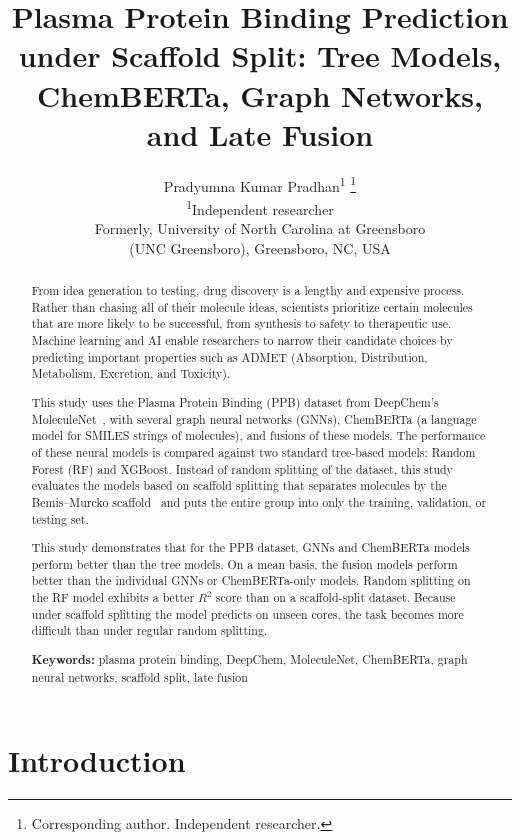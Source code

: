 \documentclass[11pt,a4paper]{article}
\title{\textbf{Plasma Protein Binding Prediction under Scaffold Split: Tree Models, ChemBERTa, Graph Networks, and Late Fusion}}
\author{%
  \begin{tabular}{c}
    Pradyumna Kumar Pradhan\textsuperscript{1}%
      \thanks{Corresponding author. Independent researcher.}\\[0.55em]
    \small\textsuperscript{1}Independent researcher\\[0.2em]
    \small Formerly, University of North Carolina at Greensboro\\
    \small (UNC Greensboro), Greensboro, NC, USA
  \end{tabular}%
}
\date{}
\begin{document}
\maketitle

\begin{abstract}
\noindent
From idea generation to testing, drug discovery is a lengthy and expensive process.
Rather than chasing all of their molecule ideas, scientists prioritize certain molecules that are more likely to be successful, from synthesis to safety to therapeutic use.
Machine learning and AI enable researchers to narrow their candidate choices by predicting important properties such as ADMET (Absorption, Distribution, Metabolism, Excretion, and Toxicity).

This study uses the Plasma Protein Binding (PPB) dataset from DeepChem's MoleculeNet~\cite{wu2018moleculenet}, with several graph neural networks (GNNs), ChemBERTa (a language model for SMILES strings of molecules), and fusions of these models.
The performance of these neural models is compared against two standard tree-based models: Random Forest (RF) and XGBoost.
Instead of random splitting of the dataset, this study evaluates the models based on scaffold splitting that separates molecules by the Bemis--Murcko scaffold~\cite{bemis1996scaffold} and puts the entire group into only the training, validation, or testing set.

This study demonstrates that for the PPB dataset, GNNs and ChemBERTa models perform better than the tree models.
On a mean basis, the fusion models perform better than the individual GNNs or ChemBERTa-only models.
Random splitting on the RF model exhibits a better $R^{2}$ score than on a scaffold-split dataset.
Because under scaffold splitting the model predicts on unseen cores, the task becomes more difficult than under regular random splitting.

\vspace{0.4em}
\noindent\textbf{Keywords:} plasma protein binding, DeepChem, MoleculeNet, ChemBERTa, graph neural networks, scaffold split, late fusion
\end{abstract}

\section{Introduction}
\end{document}
